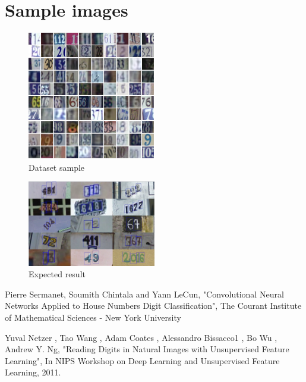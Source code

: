 \documentclass[12pt, letterpaper]{article}
\begin{document}
\section{Sample images}
\begin{figure}[h]
\centering
\includegraphics[width=0.5\textwidth]{dataset.png}
\caption{Dataset sample }
\end{figure}
\begin{figure}[h]
\centering
\includegraphics[width=0.5\textwidth]{example.png}
\caption{Expected result}
\end{figure}
\newpage
\begin{thebibliography}{9}
Pierre Sermanet, Soumith Chintala and Yann LeCun, "Convolutional Neural Networks Applied to
House Numbers Digit Classification", The Courant Institute of Mathematical Sciences - New York University 


Yuval Netzer
, Tao Wang
, Adam Coates
, Alessandro Bissacco1
, Bo Wu
, Andrew Y. Ng, "Reading Digits in Natural Images
with Unsupervised Feature Learning", In NIPS Workshop on Deep
Learning and Unsupervised Feature Learning, 2011.

\end{thebibliography} 
\end{document}
